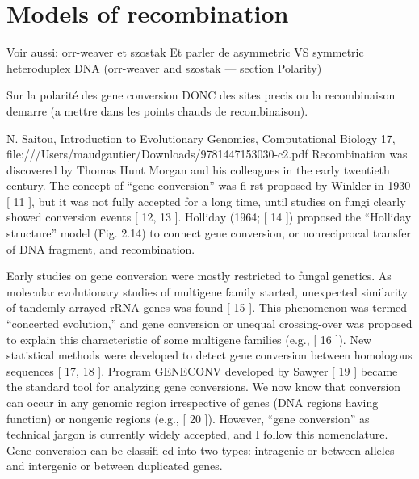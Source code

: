 







\section{Models of recombination}

Voir aussi: orr-weaver et szostak
Et parler de asymmetric VS symmetric heteroduplex DNA (orr-weaver and szostak — section Polarity)


Sur la polarité des gene conversion DONC des sites precis ou la recombinaison demarre (a mettre dans les points chauds de recombinaison).

N. Saitou, Introduction to Evolutionary Genomics, Computational Biology 17,
file:///Users/maudgautier/Downloads/9781447153030-c2.pdf
Recombination was discovered by Thomas Hunt Morgan and his colleagues in the
early twentieth century. The concept of “gene conversion” was fi rst proposed by
Winkler in 1930 [ 11  ], but it was not fully accepted for a long time, until studies on
fungi clearly showed conversion events [ 12, 13  ]. Holliday (1964; [ 14  ]) proposed the
“Holliday structure” model (Fig. 2.14) to connect gene conversion, or nonreciprocal
transfer of DNA fragment, and recombination.


Early studies on gene conversion were mostly restricted to fungal genetics. As
molecular evolutionary studies of multigene family started, unexpected similarity
of tandemly arrayed rRNA genes was found [ 15  ]. This phenomenon was termed
“concerted evolution,” and gene conversion or unequal crossing-over was proposed
to explain this characteristic of some multigene families (e.g., [ 16  ]). New statistical
methods were developed to detect gene conversion between homologous
sequences [ 17, 18  ]. Program GENECONV developed by Sawyer [ 19  ] became the
standard tool for analyzing gene conversions. We now know that conversion can
occur in any genomic region irrespective of genes (DNA regions having function)
or nongenic regions (e.g., [ 20  ]). However, “gene conversion” as technical jargon is
currently widely accepted, and I follow this nomenclature. Gene conversion can be
classifi ed into two types: intragenic or between alleles and intergenic or between
duplicated genes. 


